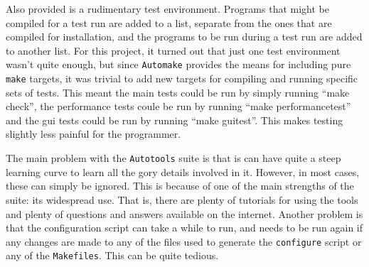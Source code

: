 Also provided is a rudimentary test environment.
Programs that might be compiled for a test run are added to a list,
separate from the ones that are compiled for installation,
and the programs to be run during a test run are added to another list.
For this project, it turned out that just one test environment
wasn't quite enough, but since \texttt{Automake} provides
the means for including pure \texttt{make} targets, it was trivial
to add new targets for compiling and running specific sets of tests.
This meant the main tests could be run by simply running
``make check'', the performance tests coule be run by running
``make performancetest'' and the gui tests could be run by running
``make guitest''.
This makes testing slightly less painful for the programmer.

The main problem with the \texttt{Autotools} suite is that is can have
quite a steep learning curve to learn all the gory details involved
in it.
However, in most cases, these can simply be ignored.
This is because of one of the main strengths of the suite: its widespread
use.
That is, there are plenty of tutorials for using the tools and plenty
of questions and answers available on the internet.
Another problem is that the configuration script can take a while to
run, and needs to be run again if any changes are made to any of the
files used to generate the \texttt{configure} script or any of the
\texttt{Makefiles}.
This can be quite tedious.
